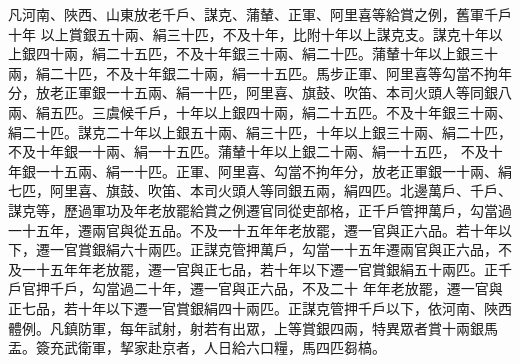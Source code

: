 \begin{pinyinscope}
 凡河南、陜西、山東放老千戶、謀克、蒲輦、正軍、阿里喜等給賞之例，舊軍千戶十年
 以上賞銀五十兩、絹三十匹，不及十年，比附十年以上謀克支。謀克十年以上銀四十兩，絹二十五匹，不及十年銀三十兩、絹二十匹。蒲輦十年以上銀三十兩，絹二十匹，不及十年銀二十兩，絹一十五匹。馬步正軍、阿里喜等勾當不拘年分，放老正軍銀一十五兩、絹一十匹，阿里喜、旗鼓、吹笛、本司火頭人等同銀八兩、絹五匹。三虞候千戶，十年以上銀四十兩，絹二十五匹。不及十年銀三十兩、絹二十匹。謀克二十年以上銀五十兩、絹三十匹，十年以上銀三十兩、絹二十匹，不及十年銀一十兩、絹一十五匹。蒲輦十年以上銀二十兩、絹一十五匹，
 不及十年銀一十五兩、絹一十匹。正軍、阿里喜、勾當不拘年分，放老正軍銀一十兩、絹七匹，阿里喜、旗鼓、吹笛、本司火頭人等同銀五兩，絹四匹。北邊萬戶、千戶、謀克等，歷過軍功及年老放罷給賞之例遷官同從吏部格，正千戶管押萬戶，勾當過一十五年，遷兩官與從五品。不及一十五年年老放罷，遷一官與正六品。若十年以下，遷一官賞銀絹六十兩匹。正謀克管押萬戶，勾當一十五年遷兩官與正六品，不及一十五年年老放罷，遷一官與正七品，若十年以下遷一官賞銀絹五十兩匹。正千戶官押千戶，勾當過二十年，遷一官與正六品，不及二十
 年年老放罷，遷一官與正七品，若十年以下遷一官賞銀絹四十兩匹。正謀克管押千戶以下，依河南、陜西體例。凡鎮防軍，每年試射，射若有出眾，上等賞銀四兩，特異眾者賞十兩銀馬盂。簽充武衛軍，挈家赴京者，人日給六口糧，馬四匹芻槁。




\end{pinyinscope}
